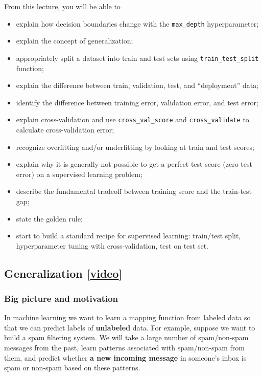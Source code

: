 \documentclass[11pt]{article}
\providecommand{\tightlist}{%
      \setlength{\itemsep}{0pt}\setlength{\parskip}{0pt}}
\begin{document}
From this lecture, you will be able to

\begin{itemize}
\tightlist
\item
  explain how decision boundaries change with the \texttt{max\_depth}
  hyperparameter;
\item
  explain the concept of generalization;
\item
  appropriately split a dataset into train and test sets using
  \texttt{train\_test\_split} function;
\item
  explain the difference between train, validation, test, and
  ``deployment'' data;
\item
  identify the difference between training error, validation error, and
  test error;
\item
  explain cross-validation and use \texttt{cross\_val\_score} and
  \texttt{cross\_validate} to calculate cross-validation error;
\item
  recognize overfitting and/or underfitting by looking at train and test
  scores;
\item
  explain why it is generally not possible to get a perfect test score
  (zero test error) on a supervised learning problem;
\item
  describe the fundamental tradeoff between training score and the
  train-test gap;
\item
  state the golden rule;
\item
  start to build a standard recipe for supervised learning: train/test
  split, hyperparameter tuning with cross-validation, test on test set.
\end{itemize}

    

    \subsection{\texorpdfstring{Generalization
{[}\href{https://youtu.be/iS2hsRRlc2M}{video}{]}}{Generalization {[}video{]}}}\label{generalization-video}

    \subsubsection{Big picture and
motivation}\label{big-picture-and-motivation}

In machine learning we want to learn a mapping function from labeled
data so that we can predict labels of \textbf{unlabeled} data. For
example, suppose we want to build a spam filtering system. We will take
a large number of spam/non-spam messages from the past, learn patterns
associated with spam/non-spam from them, and predict whether \textbf{a
new incoming message} in someone's inbox is spam or non-spam based on
these patterns.
\end{document}
